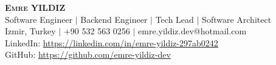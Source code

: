 \begin{center}
    \textbf{\Huge \scshape Emre YILDIZ} \\ \vspace{2pt}
    \large Software Engineer $|$ Backend Engineer $|$ Tech Lead $|$ Software Architect \\ \vspace{2pt}
    Izmir, Turkey $|$ +90 532 563 0256 $|$ emre.yildiz.dev@hotmail.com \\ \vspace{1pt}
    LinkedIn: \href{https://linkedin.com/in/emre-yildiz-297ab0242}{\underline{https://linkedin.com/in/emre-yildiz-297ab0242}} \\ \vspace{1pt}
    GitHub: \href{https://github.com/emre-yildiz-dev}{\underline{https://github.com/emre-yildiz-dev}}
\end{center}